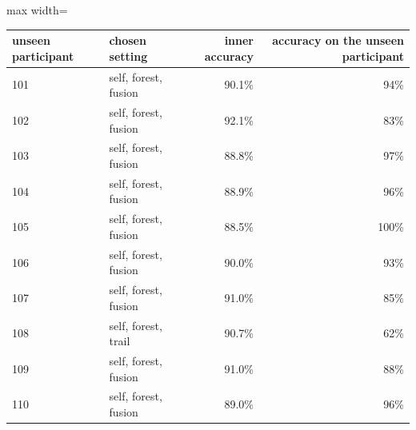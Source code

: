 \begin{adjustbox}{max width=\textwidth}
{\footnotesize
\begin{tabular}{llrr}
\toprule
\textbf{unseen participant} & \textbf{chosen setting} & \textbf{inner accuracy} & \textbf{accuracy on the unseen participant} \\
\midrule
101 & self, forest, fusion & 90.1\% & 94\% \\
102 & self, forest, fusion & 92.1\% & 83\% \\
103 & self, forest, fusion & 88.8\% & 97\% \\
104 & self, forest, fusion & 88.9\% & 96\% \\
105 & self, forest, fusion & 88.5\% & 100\% \\
106 & self, forest, fusion & 90.0\% & 93\% \\
107 & self, forest, fusion & 91.0\% & 85\% \\
108 & self, forest, trail & 90.7\% & 62\% \\
109 & self, forest, fusion & 91.0\% & 88\% \\
110 & self, forest, fusion & 89.0\% & 96\% \\
\bottomrule
\end{tabular}
}
\end{adjustbox}
